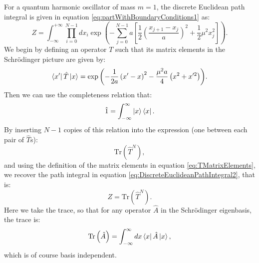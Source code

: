 \documentclass[12pt]{article}
\begin{document}
        For a quantum harmonic oscillator of mass $m=1$, the discrete Euclidean path integral is given in equation \ref{eq:partWithBoundaryConditions1} as:
        \begin{equation}
            \label{eq:DiscreteEuclideanPathIntegral2}
            Z = \int^{+\infty}_{-\infty}\prod_{i=0}^{N-1}dx_i \exp{\left(-\sum^{N-1}_{j=0} a \left[\frac{1}{2}\left(\frac{x_{j+1}-x_j}{a}\right)^2+\frac{1}{2}\mu^2x_{j}^2\right]\right)}.
        \end{equation}
        We begin by defining an operator $T$ such that its matrix elements in the Schr{\"o}dinger picture are given by:
        \begin{equation}
            \label{eq:TMatrixElements}
            \bra{x'}\hat{T}\ket{x} = \exp{\left(-\frac{1}{2a}\left(x'-x\right)^2-\frac{\mu^2a}{4}\left(x^2+x'^2\right)\right)}.
        \end{equation}
        Then we can use the completeness relation that:
        \begin{equation}
            \label{eq:CompletenessRelation}
            \hat{1} = \int_{-\infty}^{\infty}\ket{x}\bra{x}.
        \end{equation}
        By inserting $N-1$ copies of this relation into the expression (one between each pair of $\hat{T}$s):
        \begin{equation}
            \label{eq:TraceT}
            \text{Tr}\left(\hat{T}^{N}\right),
        \end{equation}
        and using the definition of the matrix elements in equation \ref{eq:TMatrixElements}, we recover the path integral in equation \ref{eq:DiscreteEuclideanPathIntegral2}, that is:
        \begin{equation}
            \label{eq:PathIntegralAsTrace}
            Z = \text{Tr}\left(\hat{T}^N\right).
        \end{equation}
        Here we take the trace, so that for any operator $\hat{A}$ in the Schr{\"o}dinger eigenbasis, the trace is:
        \begin{equation}
            \label{eq:Trace}
            \text{Tr}\left(\hat{A}\right) = \int_{-\infty}^{\infty}dx\bra{x}\hat{A}\ket{x},
        \end{equation}
        which is of course basis independent.
\end{document}
